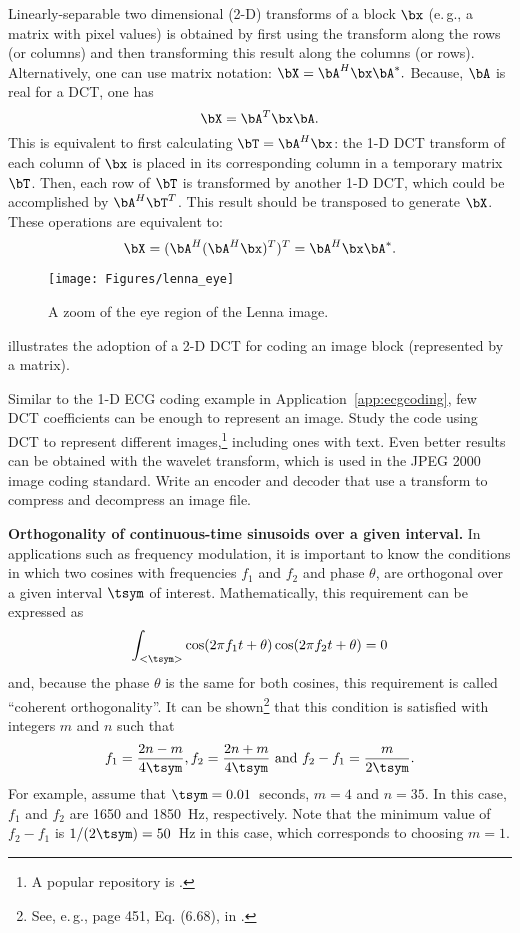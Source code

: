 Linearly-separable two dimensional (2-D) transforms of a block $\bx$ (e.\,g., a matrix with pixel values) is obtained by first using the transform along the rows (or columns) and then transforming this result along the columns (or rows). Alternatively, one can use matrix notation:
$\bX = \bA^H \bx \bA^*.$
Because, $\bA$ is real for a DCT, one has
\[
\bX = \bA^T \bx \bA.
\]
This is equivalent to first calculating $\bT=\bA^H \bx$: the 1-D DCT transform of each column of $\bx$ is placed in its corresponding column in a temporary matrix $\bT$. Then, each row of $\bT$ is transformed by another 1-D DCT, which could be accomplished by
$\bA^H \bT^T$. This result should be transposed to generate $\bX$. These operations are equivalent to:
\[
\bX = (\bA^H (\bA^H \bx)^T)^T = \bA^H \bx \bA^*.
\]

\begin{figure}[!htb]
        \centering
                \texttt{[image: Figures/lenna\_eye]}           
        \caption{A zoom of the eye region of the Lenna image.\label{fig:lenna_eye}}
\end{figure}

 illustrates the adoption of a 2-D DCT for coding an image block (represented by a matrix).


Similar to the 1-D ECG coding example in Application~\ref{app:ecgcoding}, few DCT coefficients can be enough to represent an image.
Study the code  using DCT to represent different images,\footnote{A popular repository is .} including ones with text. Even better results can be obtained with the wavelet transform, which is used in the JPEG 2000 image coding standard. Write an encoder and decoder that use a transform to compress and decompress an image file.
\eApplication

\bApplication \textbf{Orthogonality of continuous-time sinusoids over a given interval.}
In applications such as frequency modulation, it is important to know the conditions
in which two cosines with frequencies $f_1$ and $f_2$ and phase $\theta$, are orthogonal
over a given interval $\tsym$ of interest. 
Mathematically, this requirement can be expressed as
\[
\int_{<\tsym>} \cos (2 \pi f_1 t + \theta) \cos (2 \pi f_2 t + \theta) = 0
\]
and, because the phase $\theta$ is the same for both cosines, this requirement is called ``coherent orthogonality''.
It can be shown\footnote{See, e.\,g., page 451, Eq. (6.68), in \cite{Dayan09}.} that this condition is satisfied with integers $m$ and $n$ such that
\[
f_1 = \frac{2n-m}{4 \tsym}, f_2 = \frac{2n+m}{4 \tsym} \textrm{~and~} f_2 - f_1 = \frac{m}{2 \tsym}.
\]
For example, assume that $\tsym=0.01$~seconds, $m=4$ and $n=35$. In this case, $f_1$ and $f_2$ are 1650 and 1850~Hz, respectively. Note that the minimum value of $f_2 - f_1$ is $1/(2\tsym)=50$~Hz in this case, which corresponds to choosing $m=1$.

